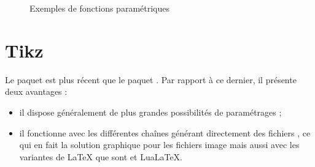 
\begin{figure}[H]
\begin{center}
\caption{Exemples de fonctions paramétriques}
\end{center}
\end{figure}


\section{Tikz} \label{tikz} %

Le paquet  est plus récent que le paquet . Par rapport à ce dernier, il présente deux avantages :
\begin{itemize}
\item il dispose généralement de plus grandes possibilités de paramétrages ;
\item il fonctionne avec les différentes chaînes générant directement des fichiers , ce qui en fait la solution graphique pour les fichiers image  mais aussi avec les variantes de \LaTeX{} que sont \XeLaTeX{} et Lua\LaTeX.
\end{itemize}

